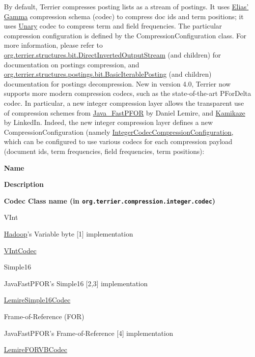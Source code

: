 By default, Terrier compresses posting lists as a stream of postings. It
uses \href{http://en.wikipedia.org/wiki/Elias_gamma_coding}{Elias'
Gamma} compression schema (codec) to compress doc ids and term
positions; it uses
\href{http://en.wikipedia.org/wiki/Unary_coding}{Unary} codec to
compress term and field frequencies. The particular compression
configuration is defined by the CompressionConfiguration class. For more
information, please refer to
\href{javadoc/org/terrier/structures/bit/DirectInvertedOutputStream.html}{org.terrier.structures.bit.DirectInvertedOutputStream}
(and children) for documentation on postings compression, and
\href{javadoc/org/terrier/structures/postings/bit/BasicIterablePosting.html}{org.terrier.structures.postings.bit.BasicIterablePosting}
(and children) documentation for postings decompression. New in version
4.0, Terrier now supports more modern compression codecs, such as the
state-of-the-art PForDelta codec. In particular, a new integer
compression layer allows the transparent use of compression schemes from
\href{https://github.com/lemire/FastPFOR}{Java\_FastPFOR} by Daniel
Lemire, and
\href{http://data.linkedin.com/opensource/kamikaze}{Kamikaze} by
LinkedIn. Indeed, the new integer compression layer defines a new
CompressionConfiguration (namely
\href{javadoc/org/terrier/structures/integer/IntegerCodecCompressionConfiguration.html}{IntegerCodecCompressionConfiguration},
which can be configured to use various codecs for each compression
payload (document ids, term frequencies, field frequencies, term
positions):

\textbf{Name}

\textbf{Description}

\textbf{Codec Class name (in
\texttt{org.terrier.compression.integer.codec})}

VInt

\href{http://hadoop.apache.org}{Hadoop}'s Variable byte {[}1{]}
implementation

\href{javadoc/org/terrier/compression/integer/codec/VIntCodec.html}{VIntCodec}

Simple16

JavaFastPFOR's Simple16 {[}2,3{]} implementation

\href{javadoc/org/terrier/compression/integer/codec/LemireSimple16Codec.html}{LemireSimple16Codec}

Frame-of-Reference (FOR)

JavaFastPFOR's Frame-of-Reference {[}4{]} implementation

\href{javadoc/org/terrier/compression/integer/codec/LemireFORVBCodec.html}{LemireFORVBCodec}

